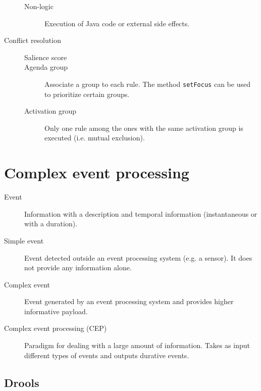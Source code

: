 \begin{description}
\begin{description}
            \item[Non-logic]
                Execution of Java code or external side effects.
        \end{description}

    \item[Conflict resolution] \phantom{}
        \begin{description}
            \item[Salience score]
            \item[Agenda group]
                Associate a group to each rule. The method \texttt{setFocus} can be used to prioritize certain groups.
            \item[Activation group]
                Only one rule among the ones with the same activation group is executed (i.e. mutual exclusion).
        \end{description}
\end{description}



\section{Complex event processing}

\begin{description}
    \item[Event] 
        Information with a description and temporal information (instantaneous or with a duration).

    \item[Simple event] 
        Event detected outside an event processing system (e.g. a sensor). It does not provide any information alone.

    \item[Complex event] 
        Event generated by an event processing system and provides higher informative payload.

    \item[Complex event processing (CEP)] 
        Paradigm for dealing with a large amount of information.
        Takes as input different types of events and outputs durative events.
\end{description}


\subsection{Drools}

